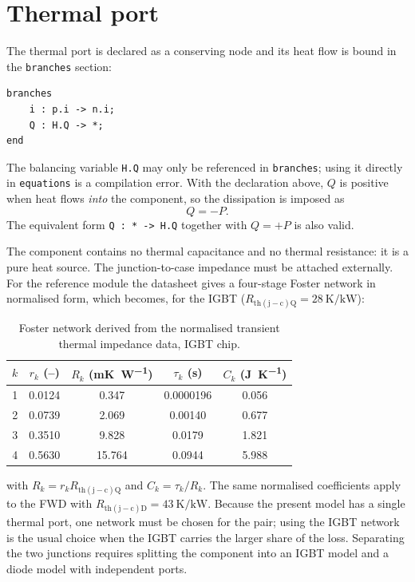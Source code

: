 \documentclass[11pt,a4paper]{article}
\newcommand{\code}[1]{\texttt{\small #1}}
\begin{document}
\section{Thermal port}

The thermal port is declared as a conserving node and its heat flow is bound in
the \code{branches} section:
\begin{lstlisting}
branches
    i : p.i -> n.i;
    Q : H.Q -> *;
end
\end{lstlisting}
The balancing variable \code{H.Q} may only be referenced in \code{branches};
using it directly in \code{equations} is a compilation error. With the
declaration above, $Q$ is positive when heat flows \emph{into} the component,
so the dissipation is imposed as
\begin{equation}
  Q = -P .
\end{equation}
The equivalent form \code{Q : * -> H.Q} together with $Q = +P$ is also valid.

The component contains no thermal capacitance and no thermal resistance: it is a
pure heat source. The junction-to-case impedance must be attached externally.
For the reference module the datasheet gives a four-stage Foster network in
normalised form, which becomes, for the IGBT
($R_\mathrm{th(j-c)Q} = \SI{28}{\kelvin\per\kilo\watt}$):

\begin{table}[h]
\centering
\caption{Foster network derived from the normalised transient thermal impedance
data, IGBT chip.}
\begin{tabular}{cS[table-format=1.3]S[table-format=2.3]S[table-format=1.3]S[table-format=1.3]}
\toprule
$k$ & {$r_k$ (--)} & {$R_k$ (\si{\milli\kelvin\per\watt})} &
{$\tau_k$ (\si{\second})} & {$C_k$ (\si{\joule\per\kelvin})} \\
 & 0.0124 & 0.347  & 0.0000196 & 0.056 \\
2 & 0.0739 & 2.069  & 0.00140   & 0.677 \\
3 & 0.3510 & 9.828  & 0.0179    & 1.821 \\
4 & 0.5630 & 15.764 & 0.0944    & 5.988 \\
\bottomrule
\end{tabular}
\end{table}

\noindent
with $R_k = r_k R_\mathrm{th(j-c)Q}$ and $C_k = \tau_k/R_k$. The same
normalised coefficients apply to the FWD with
$R_\mathrm{th(j-c)D} = \SI{43}{\kelvin\per\kilo\watt}$. Because the present
model has a single thermal port, one network must be chosen for the pair; using
the IGBT network is the usual choice when the IGBT carries the larger share of
the loss. Separating the two junctions requires splitting the component into an
IGBT model and a diode model with independent ports.
\end{document}
